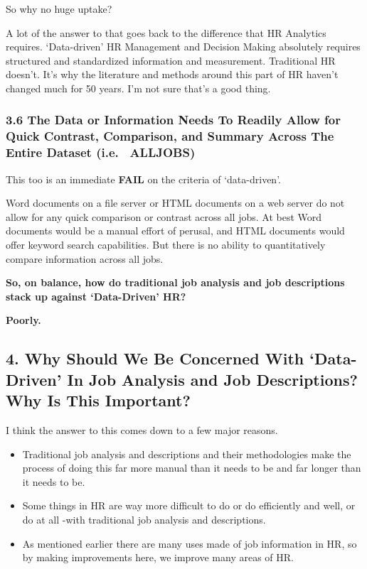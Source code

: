 \documentclass[12pt,letterpaper]{article}
\begin{document}
{{{So why no huge uptake?

A lot of the answer to that goes back to the difference that HR
Analytics requires. `Data-driven' HR Management and Decision Making
absolutely requires structured and standardized information and
measurement. Traditional HR doesn't. It's why the literature and methods
around this part of HR haven't changed much for 50 years. I'm not sure
that's a good thing.

\subsubsection{3.6 The Data or Information Needs
To Readily Allow for Quick Contrast, Comparison, and Summary Across The
Entire Dataset (i.e.~ ALLJOBS)}


This too is an immediate \textbf{FAIL} on the criteria of `data-driven'.

Word documents on a file server or HTML documents on a web server do not
allow for any quick comparison or contrast across all jobs. At best Word
documents would be a manual effort of perusal, and HTML documents would
offer keyword search capabilities. But there is no ability to
quantitatively compare information across all jobs.

\textbf{So, on balance, how do traditional job analysis and job
descriptions stack up against `Data-Driven' HR?}

\textbf{Poorly.}

\subsection{4. Why Should We Be Concerned With `Data-Driven' In Job
Analysis and Job Descriptions? Why Is This
Important?}

I think the answer to this comes down to a few major reasons.

\begin{itemize}
\item
  Traditional job analysis and descriptions and their methodologies make
  the process of doing this far more manual than it needs to be and far
  longer than it needs to be.
\item
  Some things in HR are way more difficult to do or do efficiently and
  well, or do at all -with traditional job analysis and descriptions.
\item
  As mentioned earlier there are many uses made of job information in
  HR, so by making improvements here, we improve many areas of HR.
\end{itemize}

}}}
\end{document}
